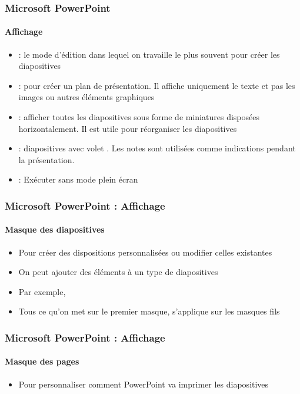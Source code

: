 \documentclass[xcolor=table, usenames,dvipsnames]{beamer}
\begin{document}
\begin{frame}
\frametitle{Microsoft PowerPoint}
\framesubtitle{Affichage}


\begin{itemize}
	\item {} : le mode d'édition dans lequel on travaille le plus souvent pour créer les diapositives
	\item {} : pour créer un plan de présentation. Il affiche uniquement le texte et pas les images ou autres éléments graphiques
	\item {} : afficher toutes les diapositives sous forme de miniatures disposées horizontalement. Il est utile pour réorganiser les diapositives
	\item {} : diapositives avec volet . Les notes sont utilisées comme indications pendant la présentation.
	\item {} : Exécuter sans mode plein écran
\end{itemize}
\end{frame}


\begin{frame}[t]
\frametitle{Microsoft PowerPoint : Affichage}
\framesubtitle{Masque des diapositives}


\begin{minipage}{0.80\textwidth}
\begin{itemize}
	\item Pour créer des dispositions personnalisées ou modifier celles existantes
	\item On peut ajouter des éléments à un type de diapositives
	\item Par exemple, 
	\item Tous ce qu'on met sur le premier masque, s'applique sur les masques fils
\end{itemize}
\end{minipage}
%
\begin{minipage}{0.19\textwidth}
\end{minipage}

\end{frame}

\begin{frame}[t]
\frametitle{Microsoft PowerPoint : Affichage}
\framesubtitle{Masque des pages}


\begin{minipage}{0.70\textwidth}
	\begin{itemize}
		\item Pour personnaliser comment PowerPoint va imprimer les diapositives
	\end{itemize}
\end{minipage}
%
\begin{minipage}{0.29\textwidth}
\end{minipage}

\end{frame}
\end{document}
